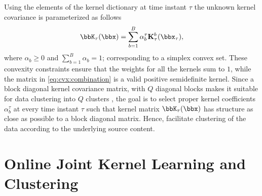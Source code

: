 \documentclass[10pt,final]{IEEEtran}
\begin{document}
Using the elements of the kernel dictionary at time instant $\tau$ the unknown kernel covariance is parameterized as follows
\begin{equation}\label{eq:cvx:combination}
\bbK_{\tau}(\bbx)=\sum_{b=1}^{B} {\alpha}_b^{\tau} \mathbf{K}_{\tau}^b(\bbx_{\tau}),
\end{equation}
where ${\alpha}_b \geq 0$ and $\textstyle\sum_{b=1}^{B} {\alpha}_b =1$; corresponding to a simplex convex set. These convexity constraints ensure that the weights for all the kernels sum to $1$, while the matrix in \eqref{eq:cvx:combination} is a valid positive semidefinite kernel. Since a block diagonal kernel covariance matrix, with $Q$ diagonal blocks makes it suitable for data clustering into $Q$ clusters \cite{DCA}, the goal is to select proper kernel coefficients ${\alpha}_b^{\tau}$ at every time instant $\tau$ such that kernel matrix $\bbK_{\tau}(\bbx)$ has structure as close as possible to a block diagonal matrix. Hence, facilitate clustering of the data according to the underlying source content.  

\section{Online Joint Kernel Learning and Clustering}
\label{sec:online}
\end{document}
